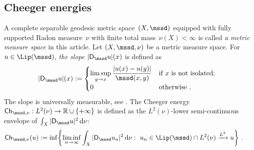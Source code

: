 \documentclass[11pt,letterpaper]{amsart}
\newcommand{\Ch}{\mathsf{Ch}}
\newcommand{\diff}{\mathop{}\!\mathrm{d}}
\newcommand{\R}{{\mathbb R}}
\newcommand{\comma}{\,\,\mathrm{,}\;\,}
\newcommand{\fstop}{\,\,\mathrm{.}}
\renewcommand{\1}{\mathbf 1}
\numberwithin{equation}{section}
\theoremstyle{plain}
\theoremstyle{definition}
\theoremstyle{remark}
\begin{document}
\subsection{Cheeger energies} \label{sec:Ch}
A complete separable geodesic metric space~$(X, \mssd)$ equipped with fully supported Radon measure~$\nu$ with finite total mass~$\nu(X)<\infty$ is called {\it a metric measure space} in this article. 
Let $(X, \mssd, \nu)$ be a metric measure space. For $u \in \Lip(\mssd)$, {\it the slope $|\mathsf D_{\mssd}u|(x)$} is defined as 
\begin{align*}
|\mathsf D_{\mssd}u|(x):=
\begin{cases} \displaystyle
\limsup_{y \to x}\frac{|u(x)-u(y)|}{\mssd(x, y)} &\text{if $x$ is not isolated}; 
\\
0 &\text{otherwise} \fstop
\end{cases}
\end{align*}
The slope is universally measurable, see \cite[Lem.~2.6]{AmbGigSav14}. 
The Cheeger energy $\Ch_{\mssd, \nu}: L^2(\nu) \to \R \cup\{+\infty\}$
 is defined as the $L^2(\nu)$-lower semi-continuous envelope of $\int_{X} |\mathsf D_\mssd u|^2 \diff \nu$: 
 \begin{align*}%
 \Ch_{\mssd, \nu}(u)&:=\inf \biggl\{ \liminf_{n \to \infty} \int_{X} |\mathsf D_{\mssd} u_n|^2 \diff \nu:\ u_n \in \Lip(\mssd)\cap L^2(\nu) \xrightarrow{L^2} u \biggr\} \fstop
\end{align*}
\end{document}
